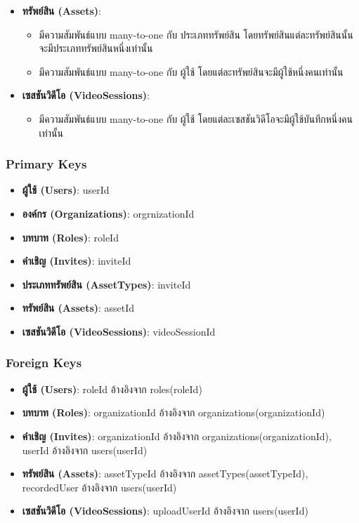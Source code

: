 \begin{itemize}
\begin{itemize}
        \end{itemize}
    \item \textbf{ทรัพย์สิน (Assets)}:
        \begin{itemize}
            \item มีความสัมพันธ์แบบ many-to-one กับ ประเภททรัพย์สิน โดยทรัพย์สินแต่ละทรัพย์สินนั้น จะมีประเภททรัพย์สินหนึ่งเท่านั้น
            \item มีความสัมพันธ์แบบ many-to-one กับ ผู้ใช้ โดยแต่ละทรัพย์สินจะมีผู้ใช้หนึ่งคนเท่านั้น
        \end{itemize}
    \item \textbf{เซสชันวิดีโอ (VideoSessions)}:
        \begin{itemize}
            \item มีความสัมพันธ์แบบ many-to-one กับ ผู้ใช้ โดยแต่ละเซสชันวิดีโอจะมีผู้ใช้บันทึกหนึ่งคนเท่านั้น
        \end{itemize}
\end{itemize}

\subsubsection{Primary Keys}
\begin{itemize}
    \item \textbf{ผู้ใช้ (Users)}: userId
    \item \textbf{องค์กร (Organizations)}: orgrnizationId
    \item \textbf{บทบาท (Roles)}: roleId
    \item \textbf{คำเชิญ (Invites)}: inviteId
    \item \textbf{ประเภททรัพย์สิน (AssetTypes)}: inviteId
    \item \textbf{ทรัพย์สิน (Assets)}: assetId
    \item \textbf{เซสชันวิดีโอ (VideoSessions)}: videoSessionId
\end{itemize}

\clearpage

\subsubsection{Foreign Keys}
\begin{itemize}
    \item \textbf{ผู้ใช้ (Users)}: roleId อ้างอิงจาก roles(roleId)
    \item \textbf{บทบาท (Roles)}: organizationId อ้างอิงจาก organizations(organizationId)
    \item \textbf{คำเชิญ (Invites)}: organizationId อ้างอิงจาก organizations(organizationId), userId อ้างอิงจาก users(userId)
    \item \textbf{ทรัพย์สิน (Assets)}: assetTypeId อ้างอิงจาก assetTypes(assetTypeId), recordedUser อ้างอิงจาก users(userId)
    \item \textbf{เซสชันวิดีโอ (VideoSessions)}: uploadUserId อ้างอิงจาก users(userId)
\end{itemize}

\fi

\clearpage